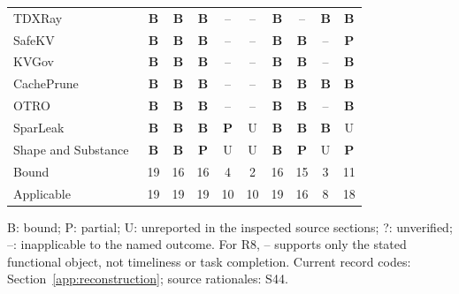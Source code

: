 \begin{table}[t]
\begin{tabularx}{\columnwidth}{@{}Y*{9}{c}@{}}
TDXRay~\cite{hornetz2026tdxray} & \textbf{B} & \textbf{B} & \textbf{B} & -- & -- & \textbf{B} & -- & \textbf{B} & \textbf{B}\\
SafeKV~\cite{chu2025safekv} & \textbf{B} & \textbf{B} & \textbf{B} & -- & -- & \textbf{B} & \textbf{B} & -- & \textbf{P}\\
KVGov~\cite{addagada2026kvgov} & \textbf{B} & \textbf{B} & \textbf{B} & -- & -- & \textbf{B} & \textbf{B} & -- & \textbf{B}\\
CachePrune~\cite{wu2026cacheprune} & \textbf{B} & \textbf{B} & \textbf{B} & -- & -- & \textbf{B} & \textbf{B} & \textbf{B} & \textbf{B}\\
OTRO~\cite{lee2026otro} & \textbf{B} & \textbf{B} & \textbf{B} & -- & -- & \textbf{B} & \textbf{B} & -- & \textbf{B}\\
SparLeak~\cite{chen2026sparleak} & \textbf{B} & \textbf{B} & \textbf{B} & \textbf{P} & U & \textbf{B} & \textbf{B} & \textbf{B} & U\\
Shape and Substance~\cite{hadad2026shape} & \textbf{B} & \textbf{B} & \textbf{P} & U & U & \textbf{B} & \textbf{P} & U & \textbf{P}\\
\midrule Bound & 19 & 16 & 16 & 4 & 2 & 16 & 15 & 3 & 11\\
Applicable & 19 & 19 & 19 & 10 & 10 & 19 & 16 & 8 & 18\\
\bottomrule\end{tabularx}
\par\smallskip\raggedright B: bound; P: partial; U: unreported in the inspected source sections; ?: unverified; --: inapplicable to the named outcome. For R8, -- supports only the stated functional object, not timeliness or task completion. Current record codes: Section~\ref{app:reconstruction}; source rationales: S44.
\end{table}
